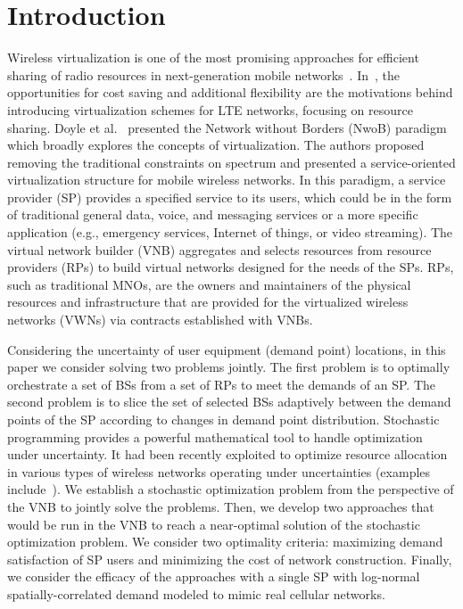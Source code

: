 \documentclass[conference]{IEEEtran}
\begin{document}
\IEEEpeerreviewmaketitle



\section{Introduction} \label{sec:intro}

Wireless virtualization is one of the most promising approaches for efficient sharing of radio resources in next-generation mobile networks~\cite{6824752}.  In~\cite{6553675, 6571315}, the opportunities for cost saving and additional flexibility are the motivations behind introducing virtualization schemes for LTE networks, focusing on resource sharing.  Doyle et al.~\cite{6737248} presented the Network without Borders (NwoB) paradigm which broadly explores the concepts of virtualization.  The authors proposed removing the traditional constraints on spectrum and presented a service-oriented virtualization structure for mobile wireless networks.  In this paradigm, a service provider (SP) provides a specified service to its users, which could be in the form of traditional general data, voice, and messaging services or a more specific application (e.g., emergency services, Internet of things, or video streaming).  The virtual network builder (VNB) aggregates and selects resources from resource providers (RPs) to build virtual networks designed for the needs of the SPs.  RPs, such as traditional MNOs, are the owners and maintainers of the physical resources and infrastructure that are provided for the virtualized wireless networks (VWNs) via contracts established with VNBs.

Considering the uncertainty of user equipment (demand point) locations, in this paper we consider solving two problems jointly.  The first problem is to optimally orchestrate a set of BSs from a set of RPs to meet the demands of an SP.  The second problem is to slice the set of selected BSs adaptively between the demand points of the SP according to changes in demand point distribution.  Stochastic programming provides a powerful mathematical tool to handle optimization under uncertainty.  It had been recently exploited to optimize resource allocation in various types of wireless networks operating under uncertainties (examples include~\cite{MJ_TW_13, CC_OFDMA, MJ_MECOMM_17, MJ_CCNC_16, MJ_WCNC_16, MJ_DySPAN_15, CC_video}).  We establish a stochastic optimization problem from the perspective of the VNB to jointly solve the problems.  Then, we develop two approaches that would be run in the VNB to reach a near-optimal solution of the stochastic optimization problem.  We consider two optimality criteria: maximizing demand satisfaction of SP users and minimizing the cost of network construction.  Finally, we consider the efficacy of the approaches with a single SP with log-normal spatially-correlated demand modeled to mimic real cellular networks.
\end{document}
